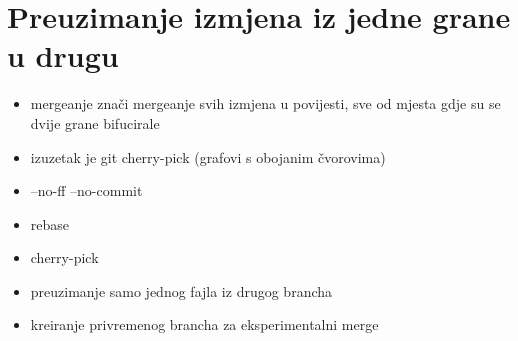 \chapter*{Preuzimanje izmjena iz jedne grane u drugu}

\begin{itemize}
   \item mergeanje znači mergeanje svih izmjena u povijesti, sve od mjesta gdje su se dvije grane bifucirale
   \item izuzetak je git cherry-pick (grafovi s obojanim čvorovima)
   \item --no-ff --no-commit
   \item rebase
   \item cherry-pick
   \item preuzimanje samo jednog fajla iz drugog brancha
   \item kreiranje privremenog brancha za eksperimentalni merge
\end{itemize}


